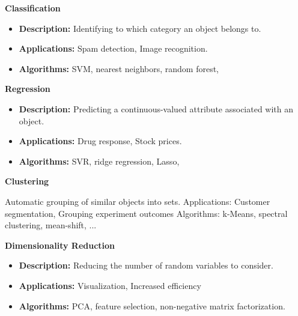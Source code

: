 \documentclass[MASTER.tex]{subfiles}
\begin{document}
\begin{frame}
	\LARGE
\textbf{Classification}
\begin{itemize}
\item \textbf{Description:} Identifying to which category an object belongs to.
\item \textbf{Applications:} Spam detection, Image recognition.
\item \textbf{Algorithms:} SVM, nearest neighbors, random forest, 
\end{itemize}

\end{frame}
\begin{frame}
\LARGE
\textbf{Regression}
\begin{itemize}
\item \textbf{Description:} Predicting a continuous-valued attribute associated with an object.
\item \textbf{Applications:} Drug response, Stock prices.
\item \textbf{Algorithms:} SVR, ridge regression, Lasso, 

\end{itemize}

\end{frame}
\begin{frame}
	\LARGE
\textbf{Clustering}

Automatic grouping of similar objects into sets.
Applications: Customer segmentation, Grouping experiment outcomes
Algorithms: k-Means, spectral clustering, mean-shift, ...
\end{frame}
\begin{frame}
	\LARGE
\textbf{Dimensionality Reduction}\\

\begin{itemize}
	\item \textbf{Description: } Reducing the number of random variables to consider.
\item \textbf{Applications:} Visualization, Increased efficiency
\item \textbf{Algorithms:} PCA, feature selection, non-negative matrix factorization. 
\end{itemize}
\end{frame}
\end{document}

